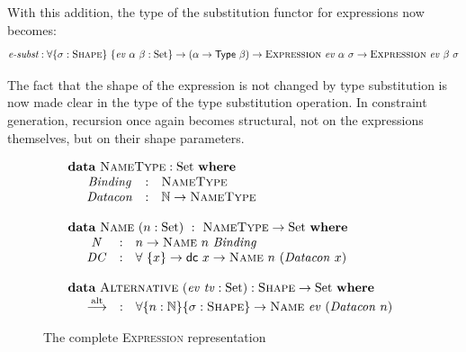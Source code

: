 \documentclass[a4paper]{jfp}
\begin{document}
With this addition, the type of the substitution functor for expressions now becomes:
\begin{displaymath}
  \textit{e-subst} : \forall \{\sigma : \textsc{Shape}\}\ \{\mathit{ev}\ \alpha\ \beta : \text{Set}\} \rightarrow (\alpha \rightarrow \textsf{Type}\ \beta)
  \rightarrow \textsc{Expression}\ \mathit{ev}\ \alpha\ \sigma \rightarrow \textsc{Expression}\ \mathit{ev}\ \beta\ \sigma  
\end{displaymath}

The fact that the shape of the expression is not changed by type substitution is now made clear in the type of the type substitution operation.
In constraint generation, recursion once again becomes structural, not on the expressions themselves, but on their shape parameters.  

\begin{figure}
   \caption{The complete \textsc{Expression} representation}
   \begin{displaymath}
      \begin{array}{l}
         \textbf{data}\ \textsc{NameType} : \text{Set}\ \textbf{where} \\
         \quad \begin{array}{cll}
            \mathit{Binding} & : & \textsc{NameType} \\
            \mathit{Datacon} & : & \mathbb{N} \rightarrow \textsc{NameType}
         \end{array} \\ \\
         \textbf{data}\ \textsc{Name}\ (n : \text{Set})\ :\ \textsc{NameType} \rightarrow \text{Set}\ \textbf{where} \\
         \quad \begin{array}{cll}
            \mathit{N} & : & n \rightarrow \textsc{Name}\ n\ \mathit{Binding} \\
            \mathit{DC} & : & \forall\ \{ x \} \rightarrow \textsf{dc}\ x \rightarrow \textsc{Name}\ n\ (\mathit{Datacon}\ x)
         \end{array} \\ \\
         \textbf{data}\ \textsc{Alternative}\ (\mathit{ev}\ \mathit{tv} : \text{Set}) : \textsc{Shape} \rightarrow \text{Set}\ \textbf{where} \\
         \quad \begin{array}{lll}
            \stackrel{\text{alt}}{\longrightarrow} & : & \forall \{ n : \mathbb{N} \}\{\sigma : \textsc{Shape}\} \rightarrow \textsc{Name}\ \mathit{ev}\ (\mathit{Datacon}\ n)

\end{array}
\end{array}
\end{displaymath}
\end{figure}
\end{document}
